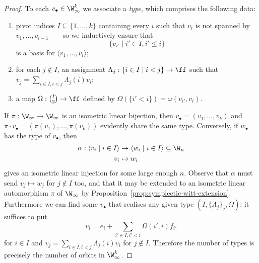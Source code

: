 \begin{proof}
    To each $v_\bullet \in \W_\infty^k$ we associate a \emph{type}, 
    which comprises the following data:
    \begin{enumerate}
        \item 
        pivot indices $I \subseteq \{1, \ldots, k\}$ containing every $i$ 
        such that $v_i$ is not spanned by $v_1, \ldots, v_{i-1}$~---~so we inductively ensure that $$\{v_{i'} \mid i' \in I, i' \leq i\}$$ is a basis for $\langle v_1, \ldots, v_i \rangle$;

        \item 
        for each $j \not\in I$, an assignment $\Lambda_j : \{i \in I \mid i < j\} \to \ff$
        such that $v_j = \sum_{i \in I, i < j} \Lambda_j(i) v_i$;

        \item 
        a map $\Omega : \binom{I}{2} \to \ff$ defined by $\Omega(\{i' < i\}) = \omega(v_{i'}, v_{i})$.
    \end{enumerate}
    If $\pi : \W_\infty \to \W_\infty$ is an isometric linear bijection,
    then $v_\bullet = (v_1, \ldots, v_k)$ and $\pi \cdot v_\bullet = (\pi(v_1), \ldots, \pi(v_k))$ evidently share the same type.
    Conversely, if $w_\bullet$ has the type of $v_\bullet$,
    then
    \begin{align*}
        \alpha : \langle v_i \mid i \in I \rangle 
        &\to \langle w_i \mid i \in I \rangle 
        \subseteq \W_n \\
        v_i &\mapsto w_i
    \end{align*}
    gives an isometric linear injection for some large enough $n$.
    Observe that $\alpha$ must send $v_j \mapsto w_j$ for $j \not\in I$ too,
    and that it may be extended to an isometric linear automorphism $\pi$ of $\W_\infty$ by Proposition~\ref{prop:symplectic-witt-extension}.
    Furthermore we can find some $v_\bullet$ that realises any given type $(I, \{\Lambda_j\}_j, \Omega)$:
    it suffices to put
    \[
        v_i = e_i + \sum_{i' \in I, i' < i} \Omega(i', i) f_{i'}
    \]
    for $i \in I$ and $v_j = \sum_{i \in I, i < j} \Lambda_j(i) v_i$ for $j \not\in I$.
    Therefore the number of types is precisely the number of orbits in $\W_\infty^k$.


\end{proof}
